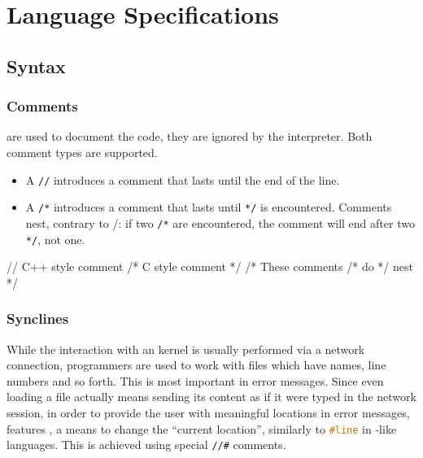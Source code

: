 \chapter{\us Language Specifications}
\label{sec:lang}

\section{Syntax}

\subsection{Comments}

 are used to document the code, they are ignored by the
\us interpreter. Both \Cxx comment types are supported.

\begin{itemize}
\item A \lstinline|//| introduces a comment that lasts until the end
  of the line.
\item A \lstinline|/*| introduces a comment that lasts until
  \lstinline|*/| is encountered. Comments nest, contrary to \C/\Cxx:
  if two \lstinline|/*| are encountered, the
  comment will end after two \lstinline|*/|, not one.
\end{itemize}

\begin{urbiscript}
// C++ style comment
/* C style comment */
/* These comments /* do */ nest */
\end{urbiscript}

\subsection{Synclines}
\label{sec:specs:synclines}

While the interaction with an \us kernel is usually performed via a
network connection, programmers are used to work with files which have
names, line numbers and so forth.  This is most important in error
messages.  Since even loading a file actually means sending its
content as if it were typed in the network session, in order to
provide the user with meaningful locations in error messages, \us
features , a means to change the ``current
location'', similarly to \lstinline[language=C]|#line| in \C-like
languages.  This is achieved using special \lstinline|//#| comments.


